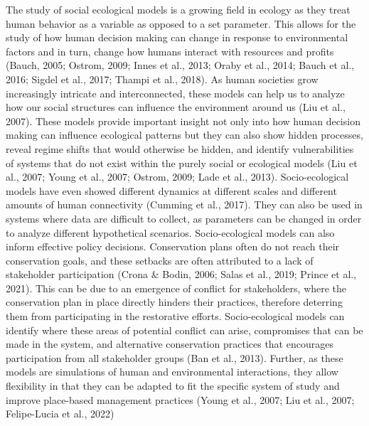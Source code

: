 \documentclass[
  12pt,
]{article}
\begin{document}
The study of social ecological models is a growing field in ecology as they treat human behavior as a variable as opposed to a set parameter. This allows for the study of how human decision making can change in response to environmental factors and in turn, change how humans interact with resources and profits (Bauch, 2005; Ostrom, 2009; Innes et al., 2013; Oraby et al., 2014; Bauch et al., 2016; Sigdel et al., 2017; Thampi et al., 2018). As human societies grow increasingly intricate and interconnected, these models can help us to analyze how our social structures can influence the environment around us (Liu et al., 2007). These models provide important insight not only into how human decision making can influence ecological patterns but they can also show hidden processes, reveal regime shifts that would otherwise be hidden, and identify vulnerabilities of systems that do not exist within the purely social or ecological models (Liu et al., 2007; Young et al., 2007; Ostrom, 2009; Lade et al., 2013). Socio-ecological models have even showed different dynamics at different scales and different amounts of human connectivity (Cumming et al., 2017). They can also be used in systems where data are difficult to collect, as parameters can be changed in order to analyze different hypothetical scenarios. Socio-ecological models can also inform effective policy decisions. Conservation plans often do not reach their conservation goals, and these setbacks are often attributed to a lack of stakeholder participation (Crona \& Bodin, 2006; Salas et al., 2019; Prince et al., 2021). This can be due to an emergence of conflict for stakeholders, where the conservation plan in place directly hinders their practices, therefore deterring them from participating in the restorative efforts. Socio-ecological models can identify where these areas of potential conflict can arise, compromises that can be made in the system, and alternative conservation practices that encourages participation from all stakeholder groups (Ban et al., 2013). Further, as these models are simulations of human and environmental interactions, they allow flexibility in that they can be adapted to fit the specific system of study and improve place-based management practices (Young et al., 2007; Liu et al., 2007; Felipe-Lucia et al., 2022)
\end{document}
